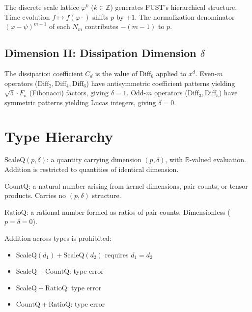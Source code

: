 The discrete scale lattice $\varphi^k$ ($k \in \mathbb{Z}$) generates FUST's hierarchical structure.
Time evolution $f \mapsto f(\varphi \cdot)$ shifts $p$ by $+1$.
The normalization denominator $(\varphi - \psi)^{m-1}$ of each $N_m$ contributes $-(m-1)$ to $p$.

\subsection{Dimension II: Dissipation Dimension \texorpdfstring{$\delta$}{δ}}

The dissipation coefficient $C_d$ is the value of $\mathrm{Diff}_6$ applied to $x^d$.
Even-$m$ operators ($\mathrm{Diff}_2, \mathrm{Diff}_4, \mathrm{Diff}_6$) have antisymmetric coefficient patterns yielding $\sqrt{5} \cdot F_n$ (Fibonacci) factors,
giving $\delta = 1$.
Odd-$m$ operators ($\mathrm{Diff}_3, \mathrm{Diff}_5$) have symmetric patterns yielding Lucas integers, giving $\delta = 0$.

\section{Type Hierarchy}
\label{sec:dim_type_hierarchy}

\begin{definition}[ScaleQuantity]
\label{def:dim_scaleq}
\leanok
$\mathrm{ScaleQ}(p, \delta)$: a quantity carrying dimension $(p, \delta)$, with $\mathbb{R}$-valued evaluation.
Addition is restricted to quantities of identical dimension.
\end{definition}

\begin{definition}[CountQuantity]
\label{def:dim_countq}
\leanok
$\mathrm{CountQ}$: a natural number arising from kernel dimensions, pair counts, or tensor products.
Carries no $(p, \delta)$ structure.
\end{definition}

\begin{definition}[RatioQuantity]
\label{def:dim_ratioq}
\leanok
$\mathrm{RatioQ}$: a rational number formed as ratios of pair counts.
Dimensionless ($p = \delta = 0$).
\end{definition}

\begin{theorem}
\label{thm:dim_type_separation}
Addition across types is prohibited:
\begin{itemize}
\item $\mathrm{ScaleQ}(d_1) + \mathrm{ScaleQ}(d_2)$ requires $d_1 = d_2$
\item $\mathrm{ScaleQ} + \mathrm{CountQ}$: type error
\item $\mathrm{ScaleQ} + \mathrm{RatioQ}$: type error
\item $\mathrm{CountQ} + \mathrm{RatioQ}$: type error
\end{itemize}
\end{theorem}

